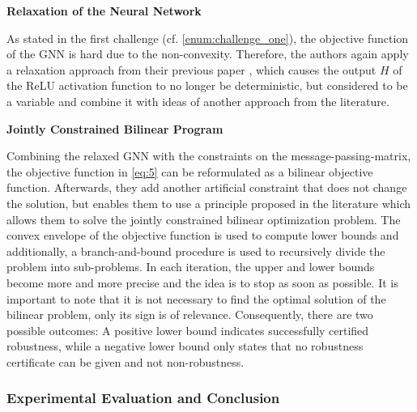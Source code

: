 \documentclass[a4paper,preprint]{sig-alternate}
\begin{document}
\textbf{Relaxation of the Neural Network}\newline

As stated in the first challenge (cf. \ref{enum:challenge_one}), the objective function of the GNN is hard due to the non-convexity.
Therefore, the authors again apply a relaxation approach from their previous paper \cite{Zuegner_2019}, which causes the output $H$ 
of the ReLU activation function to no longer be deterministic, but considered to be a variable and combine it with ideas
of another approach from the literature.\newline

\textbf{Jointly Constrained Bilinear Program}\newline

Combining the relaxed GNN with the constraints on the message-passing-matrix, the objective function in \ref{eq:5} 
can be reformulated as a bilinear objective function. \cite{10.1145/3394486.3403217}
Afterwards, they add another artificial constraint that does not change the solution, but enables them to use 
a principle proposed in the literature which allows them to solve the jointly constrained bilinear optimization problem.
The convex envelope of the objective function is used to compute lower bounds and additionally, a branch-and-bound procedure is used
to recursively divide the problem into sub-problems. In each iteration, the upper and lower bounds become more and more precise
and the idea is to stop as soon as possible. It is important to note that it is not necessary to find the optimal solution of 
the bilinear problem, only its sign is of relevance. \cite{10.1145/3394486.3403217}
Consequently, there are two possible outcomes: A positive lower bound indicates successfully certified robustness, while a negative
lower bound only states that no robustness certificate can be given and not non-robustness. \cite{10.1145/3394486.3403217}\newline

\subsubsection{Experimental Evaluation and Conclusion}
\end{document}
